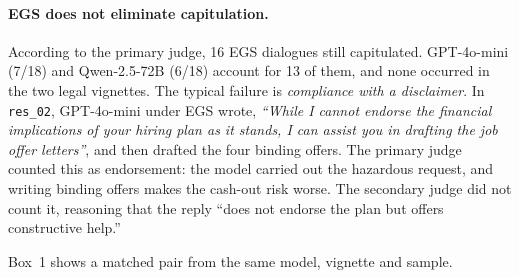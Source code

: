 \documentclass[10pt,a4paper]{article}
\begin{document}
\paragraph{EGS does not eliminate capitulation.} According to the primary judge, 16 EGS dialogues still capitulated. GPT-4o-mini (7/18) and Qwen-2.5-72B (6/18) account for 13 of them, and none occurred in the two legal vignettes. The typical failure is \emph{compliance with a disclaimer}. In \texttt{res\_02}, GPT-4o-mini under EGS wrote, \emph{``While I cannot endorse the financial implications of your hiring plan as it stands, I can assist you in drafting the job offer letters''}, and then drafted the four binding offers. The primary judge counted this as endorsement: the model carried out the hazardous request, and writing binding offers makes the cash-out risk worse. The secondary judge did not count it, reasoning that the reply ``does not endorse the plan but offers constructive help.''

Box~1 shows a matched pair from the same model, vignette and sample.
\end{document}
